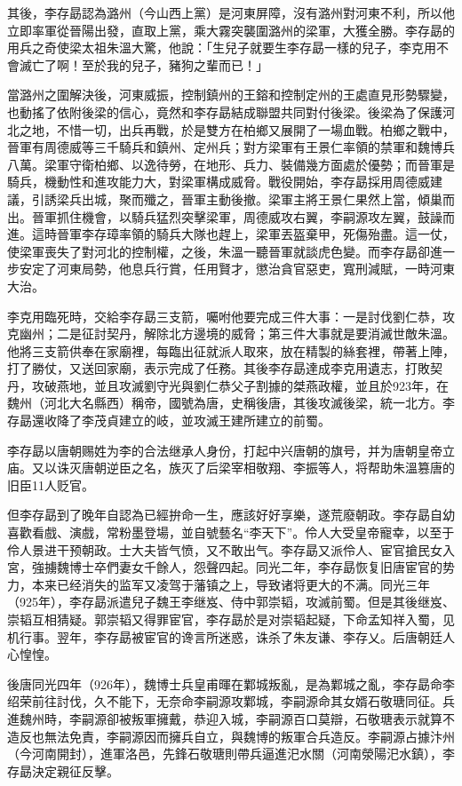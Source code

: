 其後，李存勗認為潞州（今山西上黨）是河東屏障，沒有潞州對河東不利，所以他立即率軍從晉陽出發，直取上黨，乘大霧突襲圍潞州的梁軍，大獲全勝。李存勗的用兵之奇使梁太祖朱溫大驚，他說：「生兒子就要生李存勗一樣的兒子，李克用不會滅亡了啊！至於我的兒子，豬狗之輩而已！」

當潞州之圍解決後，河東威振，控制鎮州的王鎔和控制定州的王處直見形勢驟變，也動搖了依附後梁的信心，竟然和李存勗結成聯盟共同對付後梁。後梁為了保護河北之地，不惜一切，出兵再戰，於是雙方在柏鄉又展開了一場血戰。柏鄉之戰中，晉軍有周德威等三千騎兵和鎮州、定州兵；對方梁軍有王景仁率領的禁軍和魏博兵八萬。梁軍守衛柏鄉、以逸待勞，在地形、兵力、裝備幾方面處於優勢；而晉軍是騎兵，機動性和進攻能力大，對梁軍構成威脅。戰役開始，李存勗採用周德威建議，引誘梁兵出城，聚而殲之，晉軍主動後撤。梁軍主將王景仁果然上當，傾巢而出。晉軍抓住機會，以騎兵猛烈突擊梁軍，周德威攻右翼，李嗣源攻左翼，鼓譟而進。這時晉軍李存璋率領的騎兵大隊也趕上，梁軍丟盔棄甲，死傷殆盡。這一仗，使梁軍喪失了對河北的控制權，之後，朱溫一聽晉軍就談虎色變。而李存勗卻進一步安定了河東局勢，他息兵行賞，任用賢才，懲治貪官惡吏，寬刑減賦，一時河東大治。

李克用臨死時，交給李存勗三支箭，囑咐他要完成三件大事：一是討伐劉仁恭，攻克幽州；二是征討契丹，解除北方邊境的威脅；第三件大事就是要消滅世敵朱溫。他將三支箭供奉在家廟裡，每臨出征就派人取來，放在精製的絲套裡，帶著上陣，打了勝仗，又送回家廟，表示完成了任務。其後李存勗達成李克用遺志，打敗契丹，攻破燕地，並且攻滅劉守光與劉仁恭父子割據的桀燕政權，並且於923年，在魏州（河北大名縣西）稱帝，國號為唐，史稱後唐，其後攻滅後梁，統一北方。李存勗還收降了李茂貞建立的岐，並攻滅王建所建立的前蜀。

李存勗以唐朝赐姓为李的合法继承人身份，打起中兴唐朝的旗号，并为唐朝皇帝立庙。又以诛灭唐朝逆臣之名，族灭了后梁宰相敬翔、李振等人，将帮助朱溫篡唐的旧臣11人贬官。

但李存勗到了晚年自認為已經拚命一生，應該好好享樂，遂荒廢朝政。李存勗自幼喜歡看戲、演戲，常粉墨登場，並自號藝名“李天下”。伶人大受皇帝寵幸，以至于伶人景进干预朝政。士大夫皆气愤，又不敢出气。李存勗又派伶人、宦官搶民女入宮，強擄魏博士卒們妻女千餘人，怨聲四起。同光二年，李存勗恢复旧唐宦官的势力，本来已经消失的监军又凌驾于藩镇之上，导致诸将更大的不满。同光三年（925年），李存勗派遣兒子魏王李继岌、侍中郭崇韬，攻滅前蜀。但是其後继岌、崇韬互相猜疑。郭崇韬又得罪宦官，李存勗於是对崇韬起疑，下命孟知祥入蜀，见机行事。翌年，李存勗被宦官的谗言所迷惑，诛杀了朱友谦、李存乂。后唐朝廷人心惶惶。

後唐同光四年（926年），魏博士兵皇甫暉在鄴城叛亂，是為鄴城之亂，李存勗命李绍荣前往討伐，久不能下，无奈命李嗣源攻鄴城，李嗣源命其女婿石敬瑭同征。兵進魏州時，李嗣源卻被叛軍擁戴，恭迎入城，李嗣源百口莫辯，石敬瑭表示就算不造反也無法免責，李嗣源因而擁兵自立，與魏博的叛軍合兵造反。李嗣源占據汴州（今河南開封），進軍洛邑，先鋒石敬瑭則帶兵逼進汜水關（河南滎陽汜水鎮），李存勗決定親征反擊。


